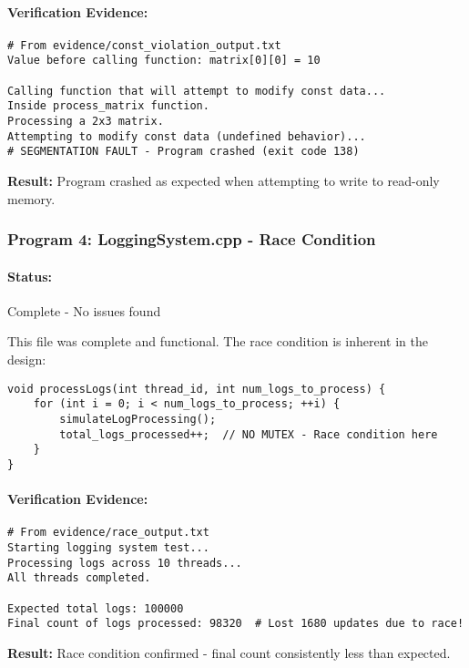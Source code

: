 \documentclass[11pt,a4paper]{article}
\begin{document}
\paragraph{Verification Evidence:}
\begin{verbatim}
# From evidence/const_violation_output.txt
Value before calling function: matrix[0][0] = 10

Calling function that will attempt to modify const data...
Inside process_matrix function.
Processing a 2x3 matrix.
Attempting to modify const data (undefined behavior)...
# SEGMENTATION FAULT - Program crashed (exit code 138)
\end{verbatim}

\textbf{Result:} Program crashed as expected when attempting to write to read-only memory.

\subsubsection{Program 4: LoggingSystem.cpp - Race Condition}

\paragraph{Status:} \checkmark Complete - No issues found

This file was complete and functional. The race condition is inherent in the design:

\begin{lstlisting}[style=cpp]
void processLogs(int thread_id, int num_logs_to_process) {
    for (int i = 0; i < num_logs_to_process; ++i) {
        simulateLogProcessing();
        total_logs_processed++;  // NO MUTEX - Race condition here
    }
}
\end{lstlisting}

\paragraph{Verification Evidence:}
\begin{verbatim}
# From evidence/race_output.txt
Starting logging system test...
Processing logs across 10 threads...
All threads completed.

Expected total logs: 100000
Final count of logs processed: 98320  # Lost 1680 updates due to race!
\end{verbatim}

\textbf{Result:} Race condition confirmed - final count consistently less than expected.
\end{document}
